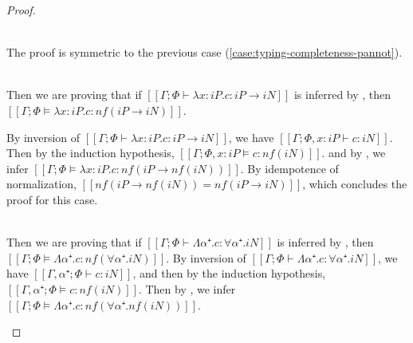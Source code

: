 \begin{proof}
\begin{caseof}
        \item {}\\
            The proof is symmetric to the previous case 
            (\cref{case:typing-completeness-pannot}).

        \item {}\\
            Then we are proving that if
            $[[Γ ; Φ ⊢ λx:iP . c : iP → iN]]$ is inferred by ,
            then $[[Γ ; Φ ⊨ λx:iP . c : nf(iP → iN)]]$.

            By inversion of $[[Γ ; Φ ⊢ λx:iP . c : iP → iN]]$, we have
            $[[Γ; Φ, x:iP ⊢ c : iN]]$.
            Then by the induction hypothesis, $[[Γ; Φ, x:iP ⊨ c : nf(iN)]]$.
            and by , we infer
            $[[Γ; Φ ⊨ λx:iP . c : nf(iP → nf(iN))]]$. 
            By idempotence of normalization, $[[nf(iP → nf(iN)) = nf(iP → iN)]]$,
            which concludes the proof for this case.

        \item {}\\
            Then we are proving that if
            $[[Γ ; Φ ⊢ Λα⁺ . c : ∀α⁺.iN]]$ is inferred by ,
            then $[[Γ ; Φ ⊨ Λα⁺ . c : nf(∀α⁺.iN)]]$.
            By inversion of $[[Γ ; Φ ⊢ Λα⁺ . c : ∀α⁺.iN]]$, we have
            $[[Γ, α⁺ ; Φ ⊢ c : iN]]$, and then by the induction hypothesis,
            $[[Γ, α⁺ ; Φ ⊨ c : nf(iN)]]$.
            Then by , we infer
            $[[Γ ; Φ ⊨ Λα⁺ . c : nf(∀α⁺.nf(iN))]]$.


\end{caseof}
\end{proof}
